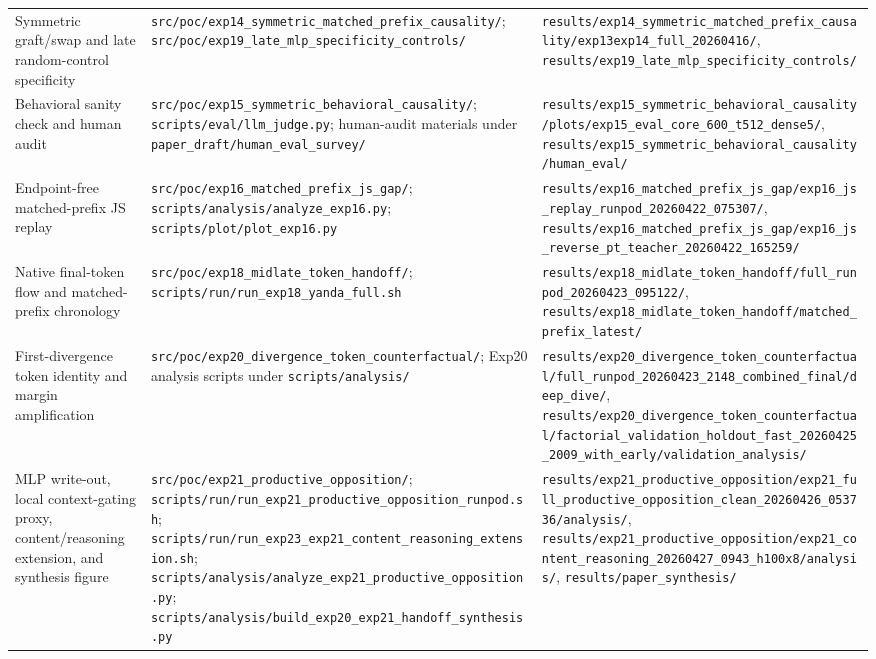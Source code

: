 \documentclass[11pt]{article}
\begin{document}
\begin{table}[t]
\begin{tabularx}{\linewidth}{@{}>{\raggedright\arraybackslash}X >{\raggedright\arraybackslash}X >{\raggedright\arraybackslash}X@{}}
Symmetric graft/swap and late random-control specificity & \texttt{src/poc/exp14\_symmetric\_matched\_prefix\_causality/}; \texttt{src/poc/exp19\_late\_mlp\_specificity\_controls/} & \texttt{results/exp14\_symmetric\_matched\_prefix\_causality/exp13exp14\_full\_20260416/}, \texttt{results/exp19\_late\_mlp\_specificity\_controls/} \\
Behavioral sanity check and human audit & \texttt{src/poc/exp15\_symmetric\_behavioral\_causality/}; \texttt{scripts/eval/llm\_judge.py}; human-audit materials under \texttt{paper\_draft/human\_eval\_survey/} & \texttt{results/exp15\_symmetric\_behavioral\_causality/plots/exp15\_eval\_core\_600\_t512\_dense5/}, \texttt{results/exp15\_symmetric\_behavioral\_causality/human\_eval/} \\
Endpoint-free matched-prefix JS replay & \texttt{src/poc/exp16\_matched\_prefix\_js\_gap/}; \texttt{scripts/analysis/analyze\_exp16.py}; \texttt{scripts/plot/plot\_exp16.py} & \texttt{results/exp16\_matched\_prefix\_js\_gap/exp16\_js\_replay\_runpod\_20260422\_075307/}, \texttt{results/exp16\_matched\_prefix\_js\_gap/exp16\_js\_reverse\_pt\_teacher\_20260422\_165259/} \\
Native final-token flow and matched-prefix chronology & \texttt{src/poc/exp18\_midlate\_token\_handoff/}; \texttt{scripts/run/run\_exp18\_yanda\_full.sh} & \texttt{results/exp18\_midlate\_token\_handoff/full\_runpod\_20260423\_095122/}, \texttt{results/exp18\_midlate\_token\_handoff/matched\_prefix\_latest/} \\
First-divergence token identity and margin amplification & \texttt{src/poc/exp20\_divergence\_token\_counterfactual/}; Exp20 analysis scripts under \texttt{scripts/analysis/} & \texttt{results/exp20\_divergence\_token\_counterfactual/full\_runpod\_20260423\_2148\_combined\_final/deep\_dive/}, \texttt{results/exp20\_divergence\_token\_counterfactual/factorial\_validation\_holdout\_fast\_20260425\_2009\_with\_early/validation\_analysis/} \\
MLP write-out, local context-gating proxy, content/reasoning extension, and synthesis figure & \texttt{src/poc/exp21\_productive\_opposition/}; \texttt{scripts/run/run\_exp21\_productive\_opposition\_runpod.sh}; \texttt{scripts/run/run\_exp23\_exp21\_content\_reasoning\_extension.sh}; \texttt{scripts/analysis/analyze\_exp21\_productive\_opposition.py}; \texttt{scripts/analysis/build\_exp20\_exp21\_handoff\_synthesis.py} & \texttt{results/exp21\_productive\_opposition/exp21\_full\_productive\_opposition\_clean\_20260426\_053736/analysis/}, \texttt{results/exp21\_productive\_opposition/exp21\_content\_reasoning\_20260427\_0943\_h100x8/analysis/}, \texttt{results/paper\_synthesis/} \\

\end{tabularx}
\end{table}
\end{document}
